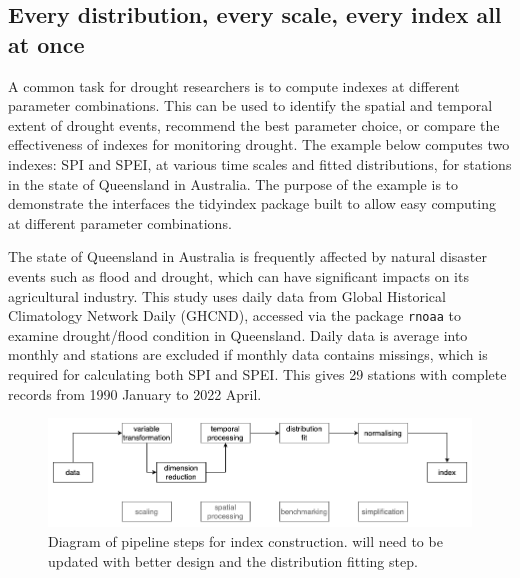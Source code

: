 \documentclass[
]{interact}
\begin{document}
\hypertarget{every-distribution-every-scale-every-index-all-at-once}{%
\subsection{Every distribution, every scale, every index all at
once}\label{every-distribution-every-scale-every-index-all-at-once}}

A common task for drought researchers is to compute indexes at different
parameter combinations. This can be used to identify the spatial and
temporal extent of drought events, recommend the best parameter choice,
or compare the effectiveness of indexes for monitoring drought. The
example below computes two indexes: SPI and SPEI, at various time scales
and fitted distributions, for stations in the state of Queensland in
Australia. The purpose of the example is to demonstrate the interfaces
the tidyindex package built to allow easy computing at different
parameter combinations.

The state of Queensland in Australia is frequently affected by natural
disaster events such as flood and drought, which can have significant
impacts on its agricultural industry. This study uses daily data from
Global Historical Climatology Network Daily (GHCND), accessed via the
package \texttt{rnoaa} to examine drought/flood condition in Queensland.
Daily data is average into monthly and stations are excluded if monthly
data contains missings, which is required for calculating both SPI and
SPEI. This gives 29 stations with complete records from 1990 January to
2022 April.

\begin{figure}

{\centering \includegraphics[width=1\textwidth,height=0.9\textheight]{figures/pipeline-spei.png}

}

\caption{\label{fig-pipeline-spei}Diagram of pipeline steps for index
construction. will need to be updated with better design and the
distribution fitting step.}

\end{figure}
\end{document}
